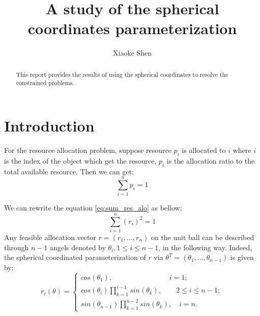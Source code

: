 \documentclass[a4paper,12pt]{article}
\title {A study of the spherical coordinates parameterization}
\author{Xiaoke Shen}
\affil{the Graduate Center, the City University of New York}
\date{}
\begin{document}
\maketitle

\begin{abstract}
This report provides the results of using the spherical coordinates to resolve the constrained problems.
\end{abstract}
\part{Introduction}
For the resource allocation problem, suppose resource $p_i$ is allocated to $i$ where $i$ is the index of the object which get the resource, $p_i$ is the allocation ratio to the total available resource. Then we can get:\\
\begin{equation} \label{eq:sum_res_alo}
\sum_{i=1}^{n} p_i = 1
\end{equation}

We can rewrite the equation \ref{eq:sum_res_alo} as bellow:\\
\begin{equation} \label{eq:sum_res_alo_r_2}
\sum_{i=1}^{n} (r_i)^2 = 1
\end{equation}
Any feasible allocation vector $r = (r_1,...,r_n)$ on the unit ball can be described through $n-1$ angels denoted by $\theta_i, 1\leq i \leq n-1$, in the following way. Indeed, the spherical coordinated parameterization of $r$ via $\theta^T = (\theta_1,...,\theta_{n-1}) $ is given by:\\



\begin{equation}\label{eq:sphe}
    r_i(\theta)=\left\{
                \begin{array}{ll}
                  cos(\theta_1), \quad \quad \quad \quad \quad \quad \quad \quad i=1;\\
                  cos(\theta_i)\prod_{k=1}^{i-1} sin(\theta_k),\quad  \quad  2\leq i \leq n-1;\\
                  sin(\theta_{n-1})\prod_{k=1}^{n-2} sin(\theta_k),\quad  i=n.
                \end{array}
              \right.
\end{equation}
\end{document}
